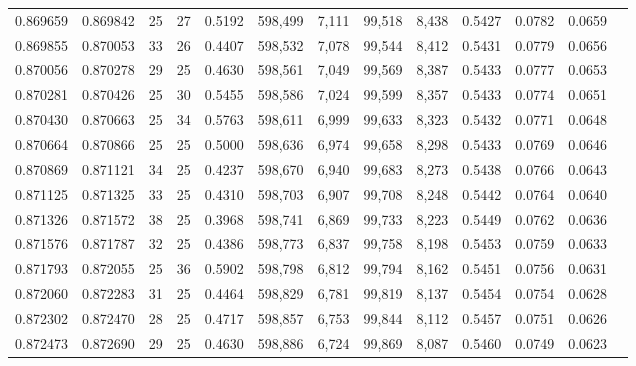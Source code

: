 \begin{tabular}{rrrrrrrrrrrrr}
0.869659 & 0.869842 &    25 &  27 &                                     0.5192 & 598,499 &   7,111 &  99,518 &   8,438 & 0.5427 & 0.0782 & 0.0659 \\
0.869855 & 0.870053 &    33 &  26 &                                     0.4407 & 598,532 &   7,078 &  99,544 &   8,412 & 0.5431 & 0.0779 & 0.0656 \\
0.870056 & 0.870278 &    29 &  25 &                                     0.4630 & 598,561 &   7,049 &  99,569 &   8,387 & 0.5433 & 0.0777 & 0.0653 \\
0.870281 & 0.870426 &    25 &  30 &                                     0.5455 & 598,586 &   7,024 &  99,599 &   8,357 & 0.5433 & 0.0774 & 0.0651 \\
0.870430 & 0.870663 &    25 &  34 &                                     0.5763 & 598,611 &   6,999 &  99,633 &   8,323 & 0.5432 & 0.0771 & 0.0648 \\
0.870664 & 0.870866 &    25 &  25 &                                     0.5000 & 598,636 &   6,974 &  99,658 &   8,298 & 0.5433 & 0.0769 & 0.0646 \\
0.870869 & 0.871121 &    34 &  25 &                                     0.4237 & 598,670 &   6,940 &  99,683 &   8,273 & 0.5438 & 0.0766 & 0.0643 \\
0.871125 & 0.871325 &    33 &  25 &                                     0.4310 & 598,703 &   6,907 &  99,708 &   8,248 & 0.5442 & 0.0764 & 0.0640 \\
0.871326 & 0.871572 &    38 &  25 &                                     0.3968 & 598,741 &   6,869 &  99,733 &   8,223 & 0.5449 & 0.0762 & 0.0636 \\
0.871576 & 0.871787 &    32 &  25 &                                     0.4386 & 598,773 &   6,837 &  99,758 &   8,198 & 0.5453 & 0.0759 & 0.0633 \\
0.871793 & 0.872055 &    25 &  36 &                                     0.5902 & 598,798 &   6,812 &  99,794 &   8,162 & 0.5451 & 0.0756 & 0.0631 \\
0.872060 & 0.872283 &    31 &  25 &                                     0.4464 & 598,829 &   6,781 &  99,819 &   8,137 & 0.5454 & 0.0754 & 0.0628 \\
0.872302 & 0.872470 &    28 &  25 &                                     0.4717 & 598,857 &   6,753 &  99,844 &   8,112 & 0.5457 & 0.0751 & 0.0626 \\
0.872473 & 0.872690 &    29 &  25 &                                     0.4630 & 598,886 &   6,724 &  99,869 &   8,087 & 0.5460 & 0.0749 & 0.0623 \\

\end{tabular}
